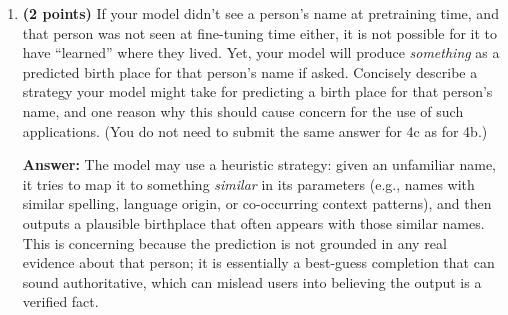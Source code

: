 \documentclass[11pt]{article}
\begin{document}
\begin{enumerate}[label=(\alph*)]
\item \textbf{(2 points)} If your model didn’t see a person’s name at pretraining time, and that person was not seen at fine-tuning time either, it is not possible for it to have ``learned'' where they lived. Yet, your model will produce \emph{something} as a predicted birth place for that person’s name if asked. Concisely describe a strategy your model might take for predicting a birth place for that person’s name, and one reason why this should cause concern for the use of such applications. (You do not need to submit the same answer for 4c as for 4b.)

\medskip
\textbf{Answer:} The model may use a heuristic strategy: given an unfamiliar name, it tries to map it to something \emph{similar} in its parameters (e.g., names with similar spelling, language origin, or co-occurring context patterns), and then outputs a plausible birthplace that often appears with those similar names. This is concerning because the prediction is not grounded in any real evidence about that person; it is essentially a best-guess completion that can sound authoritative, which can mislead users into believing the output is a verified fact.

\end{enumerate}
\end{document}

